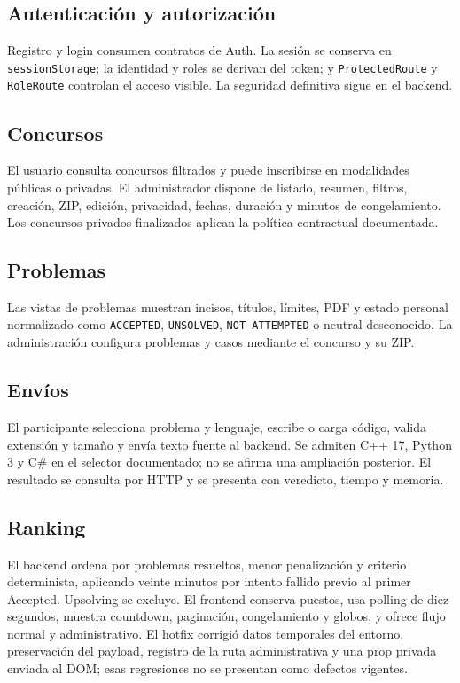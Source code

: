 \documentclass[11pt,a4paper]{article}
\begin{document}
\subsection{Autenticación y autorización}
Registro y login consumen contratos de Auth. La sesión se conserva en \texttt{sessionStorage}; la identidad y roles se derivan del token; y \texttt{ProtectedRoute} y \texttt{RoleRoute} controlan el acceso visible. La seguridad definitiva sigue en el backend.

\subsection{Concursos}
El usuario consulta concursos filtrados y puede inscribirse en modalidades públicas o privadas. El administrador dispone de listado, resumen, filtros, creación, ZIP, edición, privacidad, fechas, duración y minutos de congelamiento. Los concursos privados finalizados aplican la política contractual documentada.

\subsection{Problemas}
Las vistas de problemas muestran incisos, títulos, límites, PDF y estado personal normalizado como \texttt{ACCEPTED}, \texttt{UNSOLVED}, \texttt{NOT ATTEMPTED} o neutral desconocido. La administración configura problemas y casos mediante el concurso y su ZIP.

\subsection{Envíos}
El participante selecciona problema y lenguaje, escribe o carga código, valida extensión y tamaño y envía texto fuente al backend. Se admiten C++ 17, Python 3 y C\# en el selector documentado; no se afirma una ampliación posterior. El resultado se consulta por HTTP y se presenta con veredicto, tiempo y memoria.

\subsection{Ranking}
El backend ordena por problemas resueltos, menor penalización y criterio determinista, aplicando veinte minutos por intento fallido previo al primer Accepted. Upsolving se excluye. El frontend conserva puestos, usa polling de diez segundos, muestra countdown, paginación, congelamiento y globos, y ofrece flujo normal y administrativo. El hotfix corrigió datos temporales del entorno, preservación del payload, registro de la ruta administrativa y una prop privada enviada al DOM; esas regresiones no se presentan como defectos vigentes.
\end{document}
